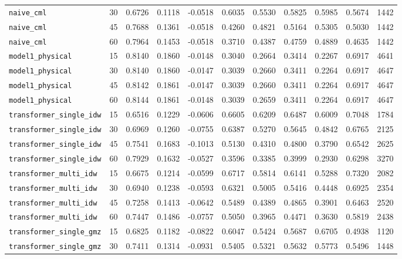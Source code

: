 \documentclass[12pt, a4paper]{article}
\begin{document}
{\begin{longtable}{p{4.0cm}cccccccccc}
\texttt{naive\_cml} & 30 & 0.6726 & 0.1118 & -0.0518 & 0.6035 & 0.5530 & 0.5825 & 0.5985 & 0.5674 & 1442 \\
\texttt{naive\_cml} & 45 & 0.7688 & 0.1361 & -0.0518 & 0.4260 & 0.4821 & 0.5164 & 0.5305 & 0.5030 & 1442 \\
\texttt{naive\_cml} & 60 & 0.7964 & 0.1453 & -0.0518 & 0.3710 & 0.4387 & 0.4759 & 0.4889 & 0.4635 & 1442 \\
\addlinespace[1pt]
\texttt{model1\_physical} & 15 & 0.8140 & 0.1860 & -0.0148 & 0.3040 & 0.2664 & 0.3414 & 0.2267 & 0.6917 & 4641 \\
\texttt{model1\_physical} & 30 & 0.8140 & 0.1860 & -0.0147 & 0.3039 & 0.2660 & 0.3411 & 0.2264 & 0.6917 & 4647 \\
\texttt{model1\_physical} & 45 & 0.8142 & 0.1861 & -0.0147 & 0.3039 & 0.2660 & 0.3411 & 0.2264 & 0.6917 & 4647 \\
\texttt{model1\_physical} & 60 & 0.8144 & 0.1861 & -0.0148 & 0.3039 & 0.2659 & 0.3411 & 0.2264 & 0.6917 & 4647 \\
\addlinespace[1pt]
\texttt{transformer\_single\_idw} & 15 & 0.6516 & 0.1229 & -0.0606 & 0.6605 & 0.6209 & 0.6487 & 0.6009 & 0.7048 & 1784 \\
\texttt{transformer\_single\_idw} & 30 & 0.6969 & 0.1260 & -0.0755 & 0.6387 & 0.5270 & 0.5645 & 0.4842 & 0.6765 & 2125 \\
\texttt{transformer\_single\_idw} & 45 & 0.7541 & 0.1683 & -0.1013 & 0.5130 & 0.4310 & 0.4800 & 0.3790 & 0.6542 & 2625 \\
\texttt{transformer\_single\_idw} & 60 & 0.7929 & 0.1632 & -0.0527 & 0.3596 & 0.3385 & 0.3999 & 0.2930 & 0.6298 & 3270 \\
\addlinespace[1pt]
\texttt{transformer\_multi\_idw} & 15 & 0.6675 & 0.1214 & -0.0599 & 0.6717 & 0.5814 & 0.6141 & 0.5288 & 0.7320 & 2082 \\
\texttt{transformer\_multi\_idw} & 30 & 0.6940 & 0.1238 & -0.0593 & 0.6321 & 0.5005 & 0.5416 & 0.4448 & 0.6925 & 2354 \\
\texttt{transformer\_multi\_idw} & 45 & 0.7258 & 0.1413 & -0.0642 & 0.5489 & 0.4389 & 0.4865 & 0.3901 & 0.6463 & 2520 \\
\texttt{transformer\_multi\_idw} & 60 & 0.7447 & 0.1486 & -0.0757 & 0.5050 & 0.3965 & 0.4471 & 0.3630 & 0.5819 & 2438 \\
\addlinespace[1pt]
\texttt{transformer\_single\_gmz} & 15 & 0.6825 & 0.1182 & -0.0822 & 0.6047 & 0.5424 & 0.5687 & 0.6705 & 0.4938 & 1120 \\
\texttt{transformer\_single\_gmz} & 30 & 0.7411 & 0.1314 & -0.0931 & 0.5405 & 0.5321 & 0.5632 & 0.5773 & 0.5496 & 1448 \\

\end{longtable}}
\end{document}

